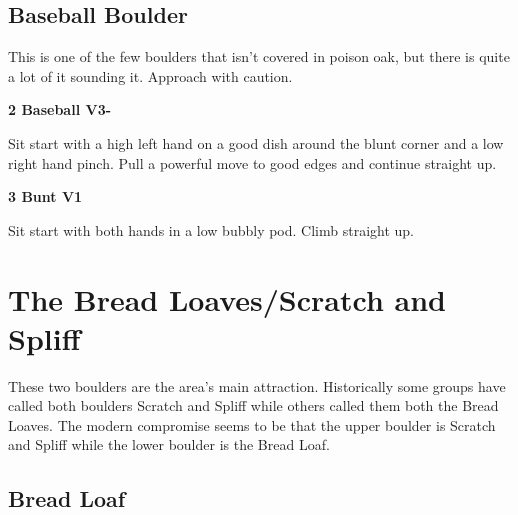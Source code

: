 \begin{multicols}{2}
\begin{minipage}{\columnwidth}
			\subsection*{Baseball Boulder}\label{bf:Baseball Boulder}
			This is one of the few boulders that isn't covered in poison oak, but there is quite a lot of it sounding it. Approach with caution.
			
			\end{minipage}
			

					\begin{minipage}{\linewidth}	
					\label{rt:Baseball}
\colorbox{green!20}{
\parbox{0.95\textwidth}{
\textbf{
2 Baseball V3-   
}
}
}

					\begin{adjustwidth}{0.5cm}{}				
					Sit start with a high left hand on a good dish around the blunt corner and a low right hand pinch. Pull a powerful move to good edges and continue straight up.
					\end{adjustwidth}
					\end{minipage}
					\begin{minipage}{\linewidth}	
					\label{rt:Bunt}
\colorbox{green!20}{
\parbox{0.95\textwidth}{
\textbf{
3 Bunt V1   
}
}
}

					\begin{adjustwidth}{0.5cm}{}				
					Sit start with both hands in a low bubbly pod. Climb straight up.
					\end{adjustwidth}
					\end{minipage}
\newpage
		\section{The Bread Loaves/Scratch and Spliff}\label{sa:The Bread Loaves/Scratch and Spliff}
	\begin{minipage}{\columnwidth}
	These two boulders are the area's main attraction. Historically some groups have called both boulders Scratch and Spliff while others called them both the Bread Loaves. The modern compromise seems to be that the upper boulder is Scratch and Spliff while the lower boulder is the Bread Loaf.
	\end{minipage}
	
			\begin{minipage}{\columnwidth}
			\subsection*{Bread Loaf}\label{bf:Bread Loaf}
			\
			

\end{minipage}
\end{multicols}
